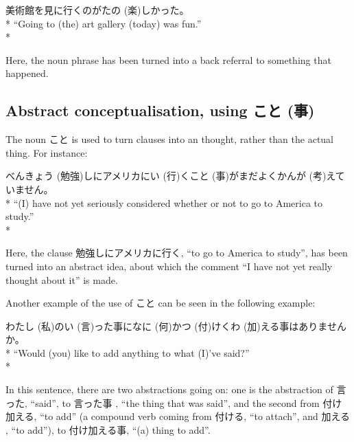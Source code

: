\documentclass[11pt, b5paper, twoside, openright, onecolumn]{book}
\makeatletter
\newcommand*{\rubystack}[2]{{\relscale{0.5}%
  \begin{tabular}[b]{@{}c@{}}%
    {#1}\\%
   {\textscale{2}{#2}}%
  \end{tabular}}%
}
\DeclareRobustCommand*{\ruby}[2]{%
  \mbox{%
    \setlength{\parskip}{0ex}%
    \BeginAccSupp{method=pdfstringdef,ActualText={#1}}%
      \rubystack{\phantom{#2}}{#1}%
      \llap{%
        \rubystack{#2}{\phantom{#1}}%
      }%
    \EndAccSupp{}%
  }%
}
\renewcommand*{\ruby}[2]{#2 (#1)}%
\newenvironment{exampleblock}{
\setlength{\parindent}{0.6in}
\begin{minipage}[t]{\dimexpr\textwidth-\parindent}}
{\end{minipage}}
\makeatother
\begin{document}
\vspace{0.4cm}
\begin{exampleblock}
美術館を見に行くのが\ruby{楽}{たの}しかった。 \\* 
“Going to (the) art gallery (today) was fun.” \\* 
\end{exampleblock}
\vspace{0.2cm}

Here‚ the noun phrase has been turned into a back referral to something that happened.

\subsection{Abstract conceptualisation‚ using \ruby{事}{こと}}

The noun こと is used to turn clauses into an  thought‚ rather than the actual thing. For instance:

\vspace{0.4cm}
\begin{exampleblock}
\ruby{勉強}{べんきょう}しにアメリカに\ruby{行}{い}く\ruby{事}{こと}がまだよく\ruby{考}{かんが}えていません。 \\* 
“(I) have not yet seriously considered whether or not to go to America to study.” \\* 
\end{exampleblock}
\vspace{0.2cm}

Here‚ the clause 勉強しにアメリカに行く‚ “to go to America to study”‚ has been turned into an abstract idea‚ about which the comment “I have not yet really thought about it” is made.

Another example of the use of こと can be seen in the following example:

\vspace{0.4cm}
\begin{exampleblock}
\ruby{私}{わたし}の\ruby{言}{い}った事に\ruby{何}{なに}か\ruby{付}{つ}け\ruby{加}{くわ}える事はありませんか。 \\* 
“Would (you) like to add anything to what (I)’ve said?” \\* 
\end{exampleblock}
\vspace{0.2cm}

In this sentence‚ there are two abstractions going on: one is the abstraction of 言った‚ “said”‚ to 言った事 ‚ “the thing that was said”‚ and the second from 付け加える‚ “to add” (a compound verb coming from 付ける‚ “to attach”‚ and 加える‚ “to add”)‚ to 付け加える事‚ “(a) thing to add”.
\end{document}
